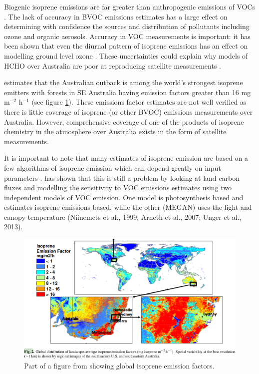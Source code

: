     Biogenic isoprene emissions are far greater than anthropogenic emissions of VOCs \citep{Guenther2006, Kefauver2014}. 
    The lack of accuracy in BVOC emissions estimates has a large effect on determining with confidence the sources and distribution of pollutants including ozone and organic aerosols.
    Accuracy in VOC measurements is important: it has been shown that even the diurnal pattern of isoprene emissions has an effect on modelling ground level ozone \citep{Hewitt_2011,Fan_2004}.
    These uncertainties could explain why models of HCHO over Australia are poor at reproducing satellite measurements \citep{Stavrakou2009}.

    \citet{Guenther2006} estimates that the Australian outback is among the world's strongest isoprene emitters with forests in SE Australia having emission factors greater than 16 mg m$^{-2}$ h$^{-1}$ (see figure \ref{ch1:fig:meganisoprene}).
    These emissions factor estimates are not well verified as there is little coverage of isoprene (or other BVOC) emissions measurements over Australia.
    However, comprehensive coverage of one of the products of isoprene chemistry in the atmosphere over Australia exists in the form of satellite measurements.
    
    It is important to note that many estimates of isoprene emission are based on a few algorithms of isoprene emission which can depend greatly on input parameters \citep{Niinemets2010}.
    \citet{Yue2015} has shown that this is still a problem by looking at land carbon fluxes and modelling the sensitivity to VOC emissions estimates using two independent models of VOC emission.
    One model is photosynthesis based and estimates isoprene emissions based, while the other (MEGAN) uses the light and canopy temperature (Niinemets et al., 1999; Arneth et al., 2007; Unger et al., 2013).
    
    \begin{figure}
      \includegraphics{Figures/MeganIsoprene1.png}
      \caption{ Part of a figure from \citet{Guenther2006} showing global isoprene emission factors. }
      \label{ch1:fig:meganisoprene}
    \end{figure}
    
